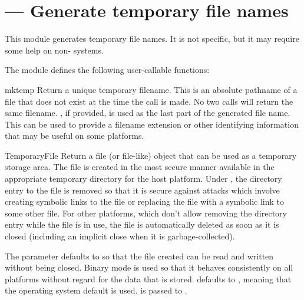 \section{ ---
         Generate temporary file names}




This module generates temporary file names.  It is not \UNIX{} specific,
but it may require some help on non-\UNIX{} systems.

The module defines the following user-callable functions:

\begin{funcdesc}{mktemp}{}
Return a unique temporary filename.  This is an absolute pathname of a
file that does not exist at the time the call is made.  No two calls
will return the same filename.  , if provided, is used as
the last part of the generated file name.  This can be used to provide
a filename extension or other identifying information that may be
useful on some platforms.
\end{funcdesc}

\begin{funcdesc}{TemporaryFile}{}
Return a file (or file-like) object that can be used as a temporary
storage area.  The file is created in the most secure manner available
in the appropriate temporary directory for the host platform.  Under
\UNIX, the directory entry to the file is removed so that it is secure
against attacks which involve creating symbolic links to the file or
replacing the file with a symbolic link to some other file.  For other
platforms, which don't allow removing the directory entry while the
file is in use, the file is automatically deleted as soon as it is
closed (including an implicit close when it is garbage-collected).

The  parameter defaults to  so that the file
created can be read and written without being closed.  Binary mode is
used so that it behaves consistently on all platforms without regard
for the data that is stored.   defaults to ,
meaning that the operating system default is used.   is
passed to .
\end{funcdesc}

